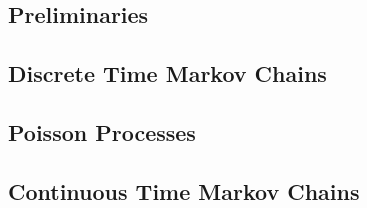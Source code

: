\documentclass{article}
\begin{document}
  \begin{multicols}{2}
    \noindent\subsection*{Preliminaries}
    
    
    
    \subsection*{Discrete Time Markov Chains}
    
    
    
    
    
    
    
    
    
    
    
    \subsection*{Poisson Processes}
    
    
    
    
    
    
    \subsection*{Continuous Time Markov Chains}
    
    
    
    
    
    
    
    

\end{multicols}
\end{document}
